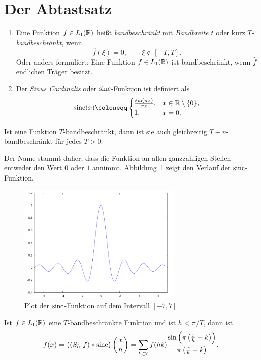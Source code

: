 \section{Der Abtastsatz}

\begin{definition}\leavevmode
\begin{enumerate}
\item Eine Funktion $ f \in L_{1}(\mathbb{R}) $ heißt \emph{bandbeschränkt} mit \emph{Bandbreite $ t $} oder
  kurz \emph{$ T $-bandbeschränkt}, wenn
  \[
    \widehat{f}(\xi) = 0, \qquad \xi \notin [-T,T].
  \]
  Oder anders formuliert: Eine Funktion $ f \in L_{1}(\mathbb{R}) $ ist bandbeschränkt, wenn $ \widehat{f} $
  endlichen Träger besitzt.
\item Der \emph{Sinus Cardinalis} oder $ \operatorname{sinc} $-Funktion ist definiert als
  \[
    \sinc(x) \coloneqq \begin{cases}
      \frac{\sin(\pi x)}{\pi x}, & x \in \R \setminus \{ 0 \}, \\
      1, & x = 0.
    \end{cases}
  \]
\end{enumerate}
\end{definition}

\begin{remark}[Bandbeschränktheit]
Ist eine Funktion $ T $-bandbeschränkt, dann ist sie auch gleichzeitig $ T + n $-bandbeschränkt für
jedes $ T > 0 $.
\end{remark}

\begin{remark}
Der Name stammt daher, dass die Funktion an allen ganzzahligen Stellen entweder den Wert $ 0 $ oder
$ 1 $ annimmt. Abbildung~\ref{fig:sinc} zeigt den Verlauf der $ \operatorname{sinc} $-Funktion.
\begin{figure}[ht]
\centering
\includegraphics[width=0.7\textwidth]{Bilder/sinc}
\caption{Plot der $ \operatorname{sinc} $-Funktion auf dem Intervall $ [-7,7] $.}
\label{fig:sinc}
\end{figure}
\end{remark}

\begin{proposition}
Ist $ f \in L_{1}(\mathbb{R}) $ eine $ T $-bandbeschränkte Funktion und ist $ h < \pi / T $, dann ist
\[
  f(x) = \left( (S_{h} \ f) * \operatorname{sinc} \right) \left( \frac{x}{h} \right) 
       = \sum_{k \in \mathbb{Z}} f(hk) 
           \frac{\sin \left( \pi \left( \frac{x}{h} - k \right) \right)}
                {\pi \left( \frac{x}{h} - k \right)}.
\]
\end{proposition}